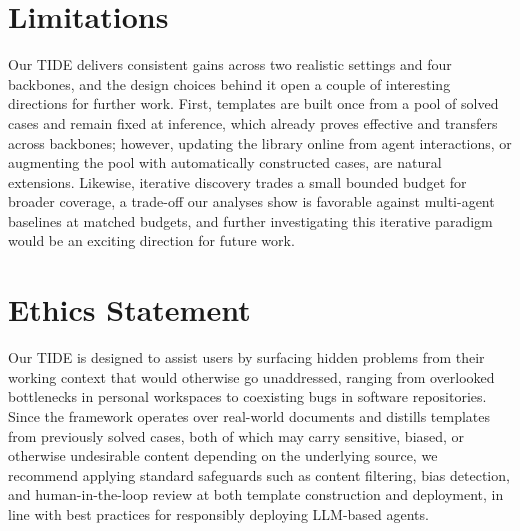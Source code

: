 \documentclass{llmxive}
\begin{document}
\section*{Limitations}
Our \textsc{TIDE} delivers consistent gains across two realistic settings and four backbones, and the design choices behind it open a couple of interesting directions for further work.
First, templates are built once from a pool of solved cases and remain fixed at inference, which already proves effective and transfers across backbones; however, updating the library online from agent interactions, or augmenting the pool with automatically constructed cases, are natural extensions.
Likewise, iterative discovery trades a small bounded budget for broader coverage, a trade-off our analyses show is favorable against multi-agent baselines at matched budgets, and further investigating this iterative paradigm would be an exciting direction for future work.

\section*{Ethics Statement}
Our \textsc{TIDE} is designed to assist users by surfacing hidden problems from their working context that would otherwise go unaddressed, ranging from overlooked bottlenecks in personal workspaces to coexisting bugs in software repositories.
Since the framework operates over real-world documents and distills templates from previously solved cases, both of which may carry sensitive, biased, or otherwise undesirable content depending on the underlying source, we recommend applying standard safeguards such as content filtering, bias detection, and human-in-the-loop review at both template construction and deployment, in line with best practices for responsibly deploying LLM-based agents.



%



\appendix


\appendix
\end{document}
